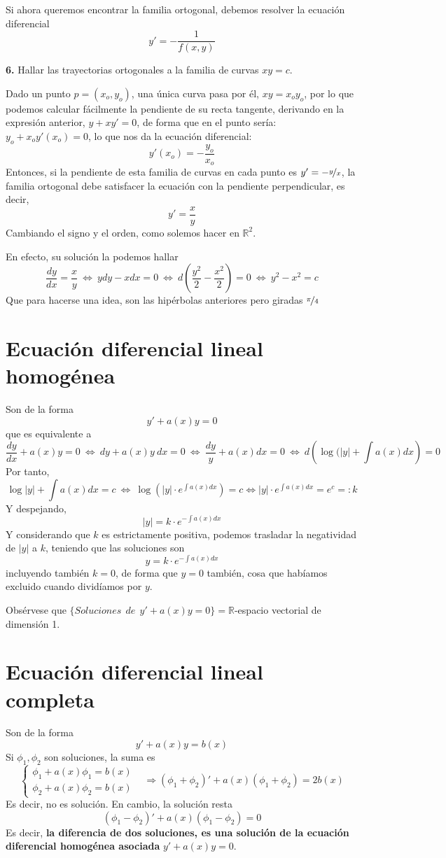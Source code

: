 Si ahora queremos encontrar la familia ortogonal, debemos resolver la ecuación diferencial 
$$y'=-\dfrac{1}{f(x,y)}$$
\begin{ejer}
    \textbf{6.} Hallar las trayectorias ortogonales a la familia de curvas $xy=c$.
\end{ejer}
\begin{sol}
    Dado un punto $p=(x_o,y_o)$, una única curva pasa por él, $xy=x_oy_o$, por lo que podemos calcular fácilmente la pendiente de su recta tangente, derivando en la expresión anterior, $y+xy'=0$, de forma que en el punto sería: $y_o+x_oy'(x_o)=0$, lo que nos da la ecuación diferencial: 
    $$y'(x_o)=-\dfrac{y_o}{x_o}$$
    Entonces, si la pendiente de esta familia de curvas en cada punto es $y'=-\nicefrac{y}{x}$, la familia ortogonal debe satisfacer la ecuación con la pendiente perpendicular, es decir, 
    $$y'=\dfrac{x}{y}$$
    Cambiando el signo y el orden, como solemos hacer en $\mathbb R^2$.

    En efecto, su solución la podemos hallar
    $$\dfrac{dy}{dx}=\dfrac{x}{y} \: \iff \: y dy-xdx=0 \: \iff \: d\left(\dfrac{y^2}{2}-\dfrac{x^2}{2}\right)=0 \: \iff \: y^2-x^2=c$$
    Que para hacerse una idea, son las hipérbolas anteriores pero giradas $\nicefrac{\pi}{4}$
\end{sol}

\section{Ecuación diferencial lineal homogénea}
Son de la forma
$$y'+a(x)y=0$$
que es equivalente a 
$$\dfrac{dy}{dx}+a(x)y=0\: \iff \: dy+a(x)y \: dx =0 \: \iff \: \dfrac{dy}{y}+a(x)dx=0 \: \iff \: d\left(\log(|y|+\int a(x)dx\right)=0$$
Por tanto, 
$$\log|y|+\int a(x) dx=c \: \iff \: \log \left( |y| \cdot e^{\int a(x)dx}\right)=c \iff |y| \cdot e^{\int a(x)dx} = e^c =: k$$
Y despejando,
$$|y|=k \cdot e^{-\int a(x) dx}$$
Y considerando que $k$ es estrictamente positiva, podemos trasladar la negatividad de $|y|$ a $k$, teniendo que las soluciones son 
$$\boxed{y=k \cdot e^{-\int a(x) dx}}$$
incluyendo también $k=0$, de forma que $y=0$ también, cosa que habíamos excluido cuando dividíamos por $y$. 

Obsérvese que $\{Soluciones \: \: de \: \: y'+a(x)y=0\}=\mathbb R$-espacio vectorial de dimensión 1.
\section{Ecuación diferencial lineal completa}
Son de la forma
$$y'+a(x)y=b(x)$$
Si $\phi_1, \phi_2$ son soluciones, la suma es
$$\left\{ \begin{array}{ll}
     \phi_1 + a(x) \phi_1 = b(x) &  \\
     \phi_2 + a(x) \phi_2 = b(x) & 
\end{array}\right. \Rightarrow (\phi_1+\phi_2)'+a(x)(\phi_1+\phi_2)=2b(x)$$
Es decir, no es solución. En cambio, la solución resta
$$(\phi_1-\phi_2)'+a(x)(\phi_1-\phi_2)=0$$
Es decir, \textbf{la diferencia de dos soluciones, es una solución de la ecuación diferencial homogénea asociada} $y'+a(x)y=0$.

